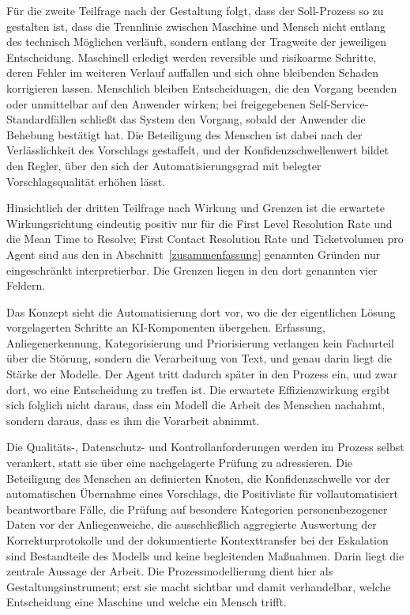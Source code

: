 F\"ur die zweite Teilfrage nach der Gestaltung folgt, dass der Soll-Prozess so zu gestalten ist, dass die Trennlinie zwischen Maschine und Mensch nicht entlang des technisch M\"oglichen verl\"auft, sondern entlang der Tragweite der jeweiligen Entscheidung. Maschinell erledigt werden reversible und risikoarme Schritte, deren Fehler im weiteren Verlauf auffallen und sich ohne bleibenden Schaden korrigieren lassen. Menschlich bleiben Entscheidungen, die den Vorgang beenden oder unmittelbar auf den Anwender wirken; bei freigegebenen Self-Service-Standardf\"allen schlie{\ss}t das System den Vorgang, sobald der Anwender die Behebung best\"atigt hat. Die Beteiligung des Menschen ist dabei nach der Verl\"asslichkeit des Vorschlags gestaffelt, und der Konfidenzschwellenwert bildet den Regler, \"uber den sich der Automatisierungsgrad mit belegter Vorschlagsqualit\"at erh\"ohen l\"asst.

Hinsichtlich der dritten Teilfrage nach Wirkung und Grenzen ist die erwartete Wirkungsrichtung eindeutig positiv nur f\"ur die First Level Resolution Rate und die Mean Time to Resolve; First Contact Resolution Rate und Ticketvolumen pro Agent sind aus den in Abschnitt~\ref{zusammenfassung} genannten Gr\"unden nur eingeschr\"ankt interpretierbar. Die Grenzen liegen in den dort genannten vier Feldern.

Das Konzept sieht die Automatisierung dort vor, wo die der eigentlichen L\"osung vorgelagerten Schritte an KI-Komponenten \"ubergehen. Erfassung, Anliegenerkennung, Kategorisierung und Priorisierung verlangen kein Fachurteil \"uber die St\"orung, sondern die Verarbeitung von Text, und genau darin liegt die St\"arke der Modelle. Der Agent tritt dadurch sp\"ater in den Prozess ein, und zwar dort, wo eine Entscheidung zu treffen ist. Die erwartete Effizienzwirkung ergibt sich folglich nicht daraus, dass ein Modell die Arbeit des Menschen nachahmt, sondern daraus, dass es ihm die Vorarbeit abnimmt.

Die Qualit\"ats-, Datenschutz- und Kontrollanforderungen werden im Prozess selbst verankert, statt sie \"uber eine nachgelagerte Pr\"ufung zu adressieren. Die Beteiligung des Menschen an definierten Knoten, die Konfidenzschwelle vor der automatischen \"Ubernahme eines Vorschlags, die Positivliste f\"ur vollautomatisiert beantwortbare F\"alle, die Pr\"ufung auf besondere Kategorien personenbezogener Daten vor der Anliegenweiche, die ausschlie{\ss}lich aggregierte Auswertung der Korrekturprotokolle und der dokumentierte Kontexttransfer bei der Eskalation sind Bestandteile des Modells und keine begleitenden Ma{\ss}nahmen. Darin liegt die zentrale Aussage der Arbeit. Die Prozessmodellierung dient hier als Gestaltungsinstrument; erst sie macht sichtbar und damit verhandelbar, welche Entscheidung eine Maschine und welche ein Mensch trifft.

